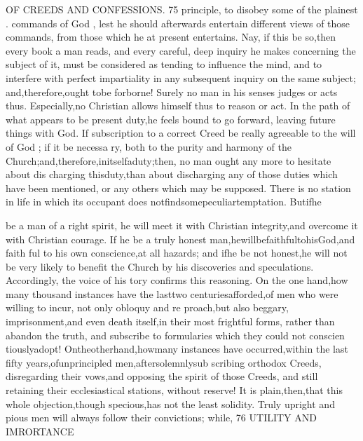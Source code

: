\documentclass[
]{book}
\begin{document}
OF CREEDS AND CONFESSIONS. 75
principle, to disobey some of the plainest . commands of God , lest he should afterwards entertain different views of those commands, from those which he at present entertains. Nay, if this be so,then every book a man reads, and every careful, deep inquiry he makes concerning the subject of it, must be considered as tending to influence the mind, and to interfere with perfect impartiality in
any subsequent inquiry on the same subject; and,therefore,ought tobe forborne!
Surely no man in his senses judges or acts thus. Especially,no Christian allows himself thus to reason or act. In the path of what
appears to be present duty,he feels bound to
go forward, leaving future things with God.
If subscription to a correct Creed be really
agreeable to the will of God ; if it be necessa
ry, both to the purity and harmony of the
Church;and,therefore,initselfaduty;then,
no man ought any more to hesitate about dis
charging thisduty,than about discharging any
of those duties which have been mentioned,
or any others which may be supposed. There is no station in life in which its occupant does
notfindsomepeculiartemptation. Butifhe

be a man of a right spirit, he will meet it with Christian integrity,and overcome it with
Christian courage. If he be a truly honest man,hewillbefaithfultohisGod,and faith
ful to his own conscience,at all hazards; and ifhe be not honest,he will not be very likely
to benefit the Church by his discoveries and speculations. Accordingly, the voice of his
tory confirms this reasoning. On the one hand,how many thousand instances have the lasttwo centuriesafforded,of men who were willing to incur, not only obloquy and re proach,but also beggary, imprisonment,and even death itself,in their most frightful forms, rather than abandon the truth, and subscribe to formularies which they could not conscien tiouslyadopt! Ontheotherhand,howmany instances have occurred,within the last fifty years,ofunprincipled men,aftersolemnlysub scribing orthodox Creeds, disregarding their vows,and opposing the spirit of those Creeds, and still retaining their ecclesiastical stations, without reserve! It is plain,then,that this whole objection,though specious,has not the
least solidity. Truly upright and pious men will always follow their convictions; while,
76
UTILITY AND IMRORTANCE
\end{document}
